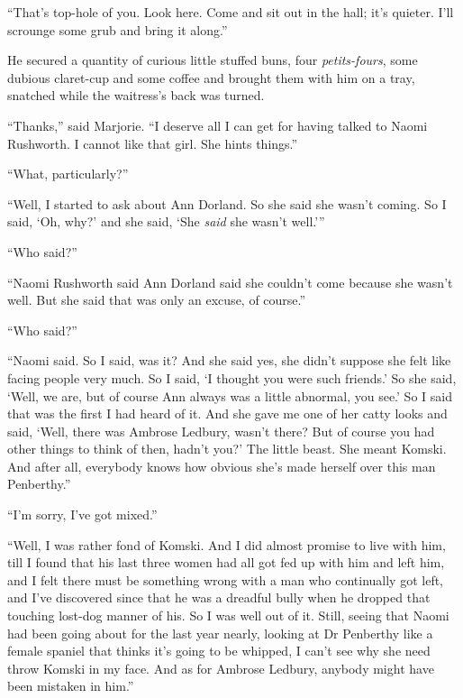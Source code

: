 \enquote{That's top-hole of you. Look here. Come and sit out in the hall; it's quieter. I'll scrounge some grub and bring it along.}

He secured a quantity of curious little stuffed buns, four \textit{petits-fours}, some dubious claret-cup and some coffee and brought them with him on a tray, snatched while the waitress's back was turned.

\enquote{Thanks,} said Marjorie. \enquote{I deserve all I can get for having talked to Naomi Rushworth. I cannot like that girl. She hints things.}

\enquote{What, particularly?}

\enquote{Well, I started to ask about Ann Dorland. So she said she wasn't coming. So I said, \enquote{Oh, why?} and she said, \enquote{She \textit{said} she wasn't well.}}

\enquote{Who said?}

\enquote{Naomi Rushworth said Ann Dorland said she couldn't come because she wasn't well. But she said that was only an excuse, of course.}

\enquote{Who said?}

\enquote{Naomi said. So I said, was it? And she said yes, she didn't suppose she felt like facing people very much. So I said, \enquote{I thought you were such friends.} So she said, \enquote{Well, we are, but of course Ann always was a little abnormal, you see.} So I said that was the first I had heard of it. And she gave me one of her catty looks and said, \enquote{Well, there was Ambrose Ledbury, wasn't there? But of course you had other things to think of then, hadn't you?} The little beast. She meant Komski. And after all, everybody knows how obvious she's made herself over this man Penberthy.}

\enquote{I'm sorry, I've got mixed.}

\enquote{Well, I was rather fond of Komski. And I did almost promise to live with him, till I found that his last three women had all got fed up with him and left him, and I felt there must be something wrong with a man who continually got left, and I've discovered since that he was a dreadful bully when he dropped that touching lost-dog manner of his. So I was well out of it. Still, seeing that Naomi had been going about for the last year nearly, looking at Dr Penberthy like a female spaniel that thinks it's going to be whipped, I can't see why she need throw Komski in my face. And as for Ambrose Ledbury, anybody might have been mistaken in him.}

